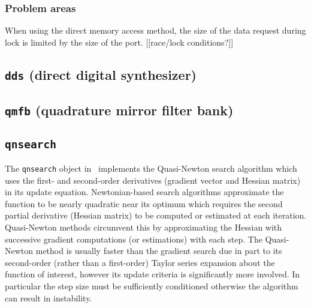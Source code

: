 \subsubsection{Problem areas}
When using the direct memory access method, the size of the data request
during lock is limited by the size of the port.
[[race/lock conditions?]]


%
%

\subsection{{\tt dds} (direct digital synthesizer)}

\subsection{{\tt qmfb} (quadrature mirror filter bank)}

%
%

\subsection{{\tt qnsearch} }
\label{module:experimental:qnsearch}
The {\tt qnsearch} object in \liquid\ implements the
Quasi-Newton search algorithm which uses the first- and second-order
derivatives (gradient vector and Hessian matrix) in its update equation.
Newtonian-based search algorithms approximate the function to be nearly
quadratic near its optimum which requires the second partial derivative
(Hessian matrix) to be computed or estimated at each iteration.
Quasi-Newton methods circumvent this by approximating the Hessian with
successive gradient computations (or estimations) with each step.
The Quasi-Newton method is usually faster than the gradient search due
in part to its second-order (rather than a first-order) Taylor series
expansion about the function of interest,
however its update criteria is significantly more involved.
In particular the step size %
must be sufficiently conditioned
otherwise the algorithm can result in instability.


